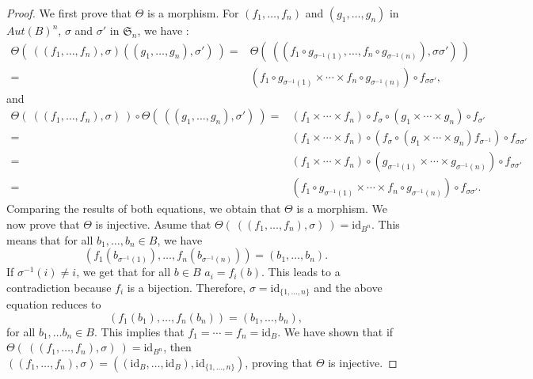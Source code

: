 \documentclass[10pt,a4paper]{amsart}
\begin{document}
\begin{proof}
We first prove that $\Theta$ is a morphism. For $(f_1,\dots,f_n)$ and $(g_1,\dots, g_n) $ in $Aut(B)^n $, $\sigma$ and $\sigma'$ in $\mathfrak{S}_n$, we have : 
$$\begin{aligned}
\Theta(\ ((f_1,\dots,f_n), \sigma) ((g_1,\dots,g_n),\sigma ') \ ) =&\Theta(\ ((f_1\circ g_{\sigma^{-1}(1)},\dots,f_n\circ g_{\sigma^{-1}(n)}),\sigma\sigma ') \ )\\
=&(f_1\circ g_{\sigma^{-1}(1)}\times \cdots \times f_n\circ g_{\sigma^{-1}(n)}) \circ f_{\sigma\sigma '},
\end{aligned}$$
and 
$$\begin{aligned}
\Theta(\ ((f_1,\dots,f_n), \sigma) \ ) \circ \Theta(\ ((g_1,\dots,g_n),\sigma ') \ ) =&(f_1\times \cdots \times f_n)\circ f_\sigma \circ (g_1\times \cdots \times g_n)\circ f_{\sigma'}\\
=&(f_1\times \cdots \times f_n)\circ (f_\sigma \circ (g_1\times \cdots \times g_n) f_{\sigma^{-1}})\circ f_{\sigma\sigma'} \\
=&(f_1\times \cdots \times f_n)\circ ( g_{\sigma^{-1}(1)}\times \cdots \times g_{\sigma^{-1}(n)})\circ f_{\sigma\sigma'}\\
=&(f_1\circ g_{\sigma^{-1}(1)}\times \cdots \times f_n\circ g_{\sigma^{-1}(n)}) \circ f_{\sigma\sigma '}.
\end{aligned}$$
Comparing the results of both equations, we obtain that $\Theta$ is a morphism. We now prove that $\Theta $ is injective. Asume that $\Theta(\ ((f_1,\dots,f_n), \sigma) \ ) =\text{id}_{B^n}$. This means that for all $b_1,\dots,b_n \in B$, we have 
$$ (f_1(b_{\sigma^{-1}(1)}),\dots, f_n(b_{\sigma^{-1}(n)}))=(b_1,\dots,b_n).$$ 
If $\sigma ^{-1}(i) \neq i$, we get that for all $b\in B$ $a_i=f_i(b)$. This leads to a contradiction because $f_i$ is a bijection. Therefore, $\sigma=\text{id}_{\{1,\dots, n \}}$ and the above equation reduces to  
$$(f_1(b_1),\dots, f_n(b_n))=(b_1,\dots,b_n), $$
for all $b_1,\dots b_n \in B$. This implies that $f_1=\cdots= f_n= \text{id}_B$. We have shown that if $\Theta(\ ((f_1,\dots,f_n), \sigma) \ ) =\text{id}_{B^n}$, then $((f_1,\dots,f_n),\sigma)=((\text{id}_B,\dots, \text{id}_B),\text{id}_{\{1,\dots,n\}})$, proving that $\Theta$ is injective.
\end{proof}
\end{document}
